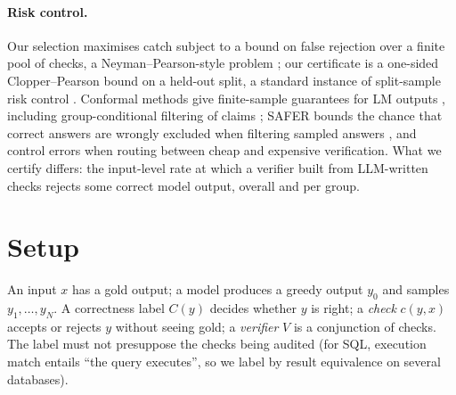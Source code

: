 \documentclass[11pt]{article}
\begin{document}
\paragraph{Risk control.} Our selection maximises catch subject to a bound
on false rejection over a finite pool of checks, a Neyman--Pearson-style
problem \citep{rigollet2011neyman}; our certificate is a one-sided
Clopper--Pearson bound \citep{clopper1934,hanley1983rule} on a held-out
split, a standard instance of split-sample risk control
\citep{angelopoulos2021ltt,angelopoulos2024crc}. Conformal methods give
finite-sample guarantees for LM outputs
\citep{quach2024conformal,mohri2024conformal}, including group-conditional
filtering of claims \citep{cherian2024conformal}; SAFER bounds the chance
that correct answers are wrongly excluded when filtering sampled answers
\citep{wang2026safer}, and \citet{kiyani2026cheap} control errors when
routing between cheap and expensive verification. What we certify differs:
the input-level rate at which a verifier built from LLM-written checks
rejects some correct model output, overall and per group.

\section{Setup}\label{sec:setup}
An input $x$ has a gold output; a model produces a greedy output $y_0$ and
samples $y_1,\dots,y_N$. A correctness label $C(y)$ decides whether $y$ is
right; a \emph{check} $c(y,x)$ accepts or rejects $y$ without seeing gold;
a \emph{verifier} $V$ is a conjunction of checks. The label must not
presuppose the checks being audited (for SQL, execution match entails ``the
query executes'', so we label by result equivalence on several databases).
\end{document}
